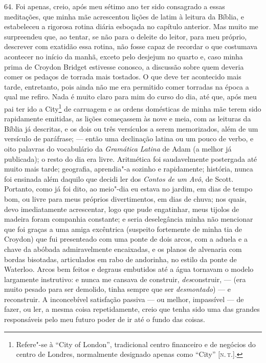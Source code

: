 64. Foi apenas, creio, após meu sétimo ano ter sido consagrado a essas
meditações, que minha mãe acrescentou lições de latim à leitura da
Bíblia, e estabeleceu a rigorosa rotina diária esboçada no capítulo
anterior. Mas muito me surpreendeu que, ao tentar, se não para o deleite
do leitor, para meu próprio, descrever com exatidão essa rotina, não
fosse capaz de recordar o que costumava acontecer no início da manhã,
exceto pelo desjejum no quarto e, caso minha prima de Croydon Bridget
estivesse conosco, a discussão sobre quem deveria comer os pedaços de
torrada mais tostados. O que deve ter acontecido mais tarde, entretanto,
pois ainda não me era permitido comer torradas na época a qual me
refiro. Nada é muito claro para mim do curso do dia, até que, após meu
pai ter ido a City\footnote{Refere"-se à ``City of London'', tradicional
  centro financeiro e de negócios do centro de Londres, normalmente
  designado apenas como ``City'' {[}\textsc{n.\,t.}{]}.} de carruagem e as
ordens domésticas de minha mãe terem sido rapidamente emitidas, as
lições começassem às nove e meia, com as leituras da Bíblia já
descritas, e os dois ou três versículos a serem memorizados, além de um
versículo de paráfrase; --- então uma declinação latina ou um pouco de
verbo, e oito palavras do vocabulário da \emph{Gramática} \emph{Latina}
de Adam (a melhor já publicada); o resto do dia era livre. Aritmética
foi saudavelmente postergada até muito mais tarde; geografia, aprendia"-a
sozinho e rapidamente; história, nunca foi ensinada além daquilo que
decidi ler dos \emph{Contos de} \emph{um Avô}, de Scott. Portanto, como
já foi dito, ao meio"-dia eu estava no jardim, em dias de tempo bom, ou
livre para meus próprios divertimentos, em dias de chuva; nos quais,
devo imediatamente acrescentar, logo que pude engatinhar, meus tijolos
de madeira foram companhia constante; e seria deselegância minha não
mencionar que foi graças a uma amiga excêntrica (suspeito fortemente de
minha tia de Croydon) que fui presenteado com uma ponte de dois arcos,
com a aduela e a chave da abóbada admiravelmente encaixadas, e os planos
de alvenaria com bordas bisotadas, articulados em rabo de andorinha, no
estilo da ponte de Waterloo. Arcos bem feitos e degraus embutidos até a
água tornavam o modelo largamente instrutivo: e nunca me cansava de
construir, \emph{des}construir, --- (era muito pesado para ser demolido,
tinha sempre que ser \emph{desmontado}) --- e reconstruir. A inconcebível
satisfação passiva --- ou melhor, impassível --- de fazer, ou ler, a mesma
coisa repetidamente, creio que tenha sido uma das grandes responsáveis
pelo meu futuro poder de ir até o fundo das coisas.

